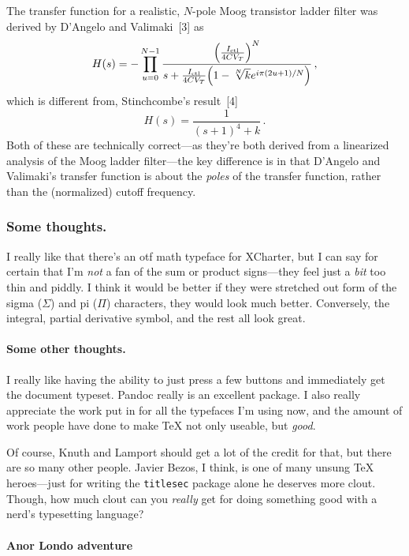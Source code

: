 \documentclass[%
	english,%
	 a4paper,%
	titlepage,%
	fleqn]{article}
\let\originalleft\left
\let\originalright\right
\renewcommand{\left}{\mathopen{}\mathclose\bgroup\originalleft}
\renewcommand{\right}{\aftergroup\egroup\originalright}
\begin{document}
The transfer function for a realistic, \(N\)-pole Moog transistor ladder
filter was derived by D'Angelo and Valimaki~{[}3{]} as
\[ H(s) = - \prod_{u = 0}^{N - 1} \frac{
\left( \frac{I_\text{ctl}}{4 C V_T} \right)^N}{s + \frac{I_\text{ctl}}{
4 C V_T} \left(1 - \sqrt[N]{k} e^{i\pi (2 u + 1) / N} \right) } \,,\]
which is different from, Stinchcombe's result~{[}4{]}
\[ H(s) = \frac{1}{(s + 1)^4 + k} \,. \] Both of these are technically
correct---as they're both derived from a linearized analysis of the Moog
ladder filter---the key difference is in that D'Angelo and Valimaki's
transfer function is about the \emph{poles} of the transfer function,
rather than the (normalized) cutoff frequency.

\hypertarget{some-thoughts.}{%
\subsubsection{Some thoughts.}\label{some-thoughts.}}

I really like that there's an otf math typeface for XCharter, but I can
say for certain that I'm \emph{not} a fan of the sum or product
signs---they feel just a \emph{bit} too thin and piddly. I think it
would be better if they were stretched out form of the sigma
(\(\Sigma\)) and pi (\(\Pi\)) characters, they would look much better.
Conversely, the integral, partial derivative symbol, and the rest all
look great.

\hypertarget{some-other-thoughts.}{%
\paragraph{Some other thoughts.}\label{some-other-thoughts.}}

I really like having the ability to just press a few buttons and
immediately get the document typeset. Pandoc really is an excellent
package. I also really appreciate the work put in for all the typefaces
I'm using now, and the amount of work people have done to make {\TeX}
not only useable, but \emph{good}.

Of course, Knuth and Lamport should get a lot of the credit for that,
but there are so many other people. Javier Bezos, I think, is one of
many unsung {\TeX} heroes---just for writing the \texttt{titlesec}
package alone he deserves more clout. Though, how much clout can you
\emph{really} get for doing something good with a nerd's typesetting
language?

\hypertarget{anor-londo-adventure}{%
\paragraph{Anor Londo adventure}\label{anor-londo-adventure}}
\end{document}
